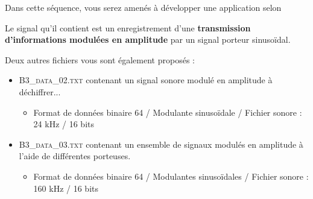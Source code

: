 

Dans cette séquence, vous serez amenés à développer une application selon 

Le signal qu'il contient est un enregistrement d'une \textbf{transmission d'informations modulées en amplitude} par un signal porteur sinusoïdal.

\medskip

Deux autres fichiers vous sont également proposés :
\begin{itemize}
	\item  \mbox{\textsc{B3\_data\_02.txt}} contenant un signal sonore modulé en amplitude à déchiffrer...
	\begin{itemize}
		\item Format de données binaire 64 / Modulante sinusoïdale / Fichier sonore : 24 kHz / 16 bits
	\end{itemize}
	\item  \mbox{\textsc{B3\_data\_03.txt}} contenant un ensemble de signaux modulés en amplitude à l'aide de différentes porteuses.
	\begin{itemize}
		\item Format de données binaire 64 / Modulantes sinusoïdales / Fichier sonore : 160 kHz / 16 bits
	\end{itemize}
\end{itemize}



